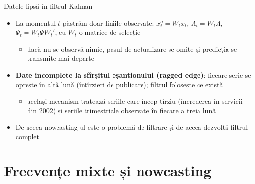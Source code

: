 \begin{frame}{Datele lipsă în filtrul Kalman}
\itemsize{\small}
\begin{itemize}
    \item La momentul $t$ păstrăm doar liniile observate: $x_t^o = W_tx_t$, $\Lambda_t = W_t\Lambda$, $\Psi_t = W_t\Psi W_t'$, cu $W_t$ o matrice de selecție
    \begin{itemize}
        \item dacă nu se observă nimic, pasul de actualizare se omite și predicția se transmite mai departe
    \end{itemize}
    \item \textbf{Date incomplete la sfîrșitul eșantionului (ragged edge)}: fiecare serie se oprește în altă lună (întîrzieri de publicare); filtrul folosește ce există
    \begin{itemize}
        \item același mecanism tratează seriile care încep tîrziu (încrederea în servicii din 2002) și seriile trimestriale observate în fiecare a treia lună
    \end{itemize}
    \item De aceea nowcasting-ul este o problemă de filtrare și de aceea  dezvoltă filtrul complet
\end{itemize}
\end{frame}


\section{Frecvențe mixte și nowcasting}

